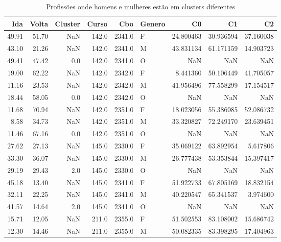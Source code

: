 \begin{table}
\centering
\caption{Profissões onde homens e mulheres estão em clusters diferentes}
\label{tab:Clusters_Diferentes}
\begin{tabular}{rrrrrlrrr}
\toprule
  Ida &  Volta &  Cluster &  Curso &    Cbo & Genero &        C0 &        C1 &        C2 \\
\midrule
49.91 &  51.70 &      NaN &  142.0 & 2341.0 &      F & 24.800463 & 30.936594 & 37.160038 \\
43.10 &  21.26 &      NaN &  142.0 & 2341.0 &      M & 43.831134 & 61.171159 & 14.903723 \\
49.41 &  47.42 &      0.0 &  142.0 & 2341.0 &      O &       NaN &       NaN &       NaN \\
19.00 &  62.22 &      NaN &  142.0 & 2342.0 &      F &  8.441360 & 50.106449 & 41.705057 \\
11.16 &  23.53 &      NaN &  142.0 & 2342.0 &      M & 41.956496 & 77.558299 & 17.154517 \\
18.44 &  58.05 &      0.0 &  142.0 & 2342.0 &      O &       NaN &       NaN &       NaN \\
11.68 &  70.94 &      NaN &  142.0 & 2351.0 &      F & 18.023056 & 55.386085 & 52.086732 \\
 8.58 &  34.73 &      NaN &  142.0 & 2351.0 &      M & 33.320827 & 72.249170 & 23.639451 \\
11.46 &  67.16 &      0.0 &  142.0 & 2351.0 &      O &       NaN &       NaN &       NaN \\
27.62 &  27.13 &      NaN &  145.0 & 2330.0 &      F & 35.069122 & 63.892954 &  5.617806 \\
33.30 &  36.07 &      NaN &  145.0 & 2330.0 &      M & 26.777438 & 53.353844 & 15.397417 \\
29.19 &  29.43 &      2.0 &  145.0 & 2330.0 &      O &       NaN &       NaN &       NaN \\
45.18 &  13.40 &      NaN &  145.0 & 2341.0 &      F & 51.922733 & 67.805169 & 18.832154 \\
32.11 &  22.25 &      NaN &  145.0 & 2341.0 &      M & 40.220547 & 65.341537 &  3.974600 \\
41.57 &  14.64 &      2.0 &  145.0 & 2341.0 &      O &       NaN &       NaN &       NaN \\
15.71 &  12.05 &      NaN &  211.0 & 2355.0 &      F & 51.502553 & 83.108002 & 15.686742 \\
12.30 &  14.46 &      NaN &  211.0 & 2355.0 &      M & 50.082335 & 83.398295 & 17.404963 \\

\end{tabular}
\end{table}
